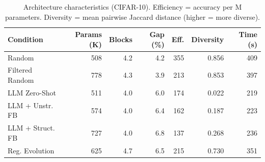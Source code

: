 \begin{table}[t]
\centering\small
\caption{Architecture characteristics (CIFAR-10). Efficiency = accuracy per M parameters. Diversity = mean pairwise Jaccard distance (higher = more diverse).}
\label{tab:arch}
\begin{tabular}{@{}l rrrrrr@{}}
\toprule
Condition & Params (K) & Blocks & Gap (\%) & Eff. & Diversity & Time (s) \\
\midrule
Random & 508 & 4.2 & 4.2 & 355 & 0.856 & 409 \\
Filtered Random & 778 & 4.3 & 3.9 & 213 & 0.853 & 397 \\
LLM Zero-Shot & 511 & 4.0 & 6.0 & 174 & 0.022 & 219 \\
LLM + Unstr. FB & 574 & 4.0 & 6.4 & 162 & 0.187 & 223 \\
LLM + Struct. FB & 727 & 4.0 & 6.8 & 137 & 0.268 & 236 \\
Reg. Evolution & 625 & 4.7 & 6.5 & 215 & 0.730 & 351 \\
\bottomrule
\end{tabular}
\end{table}